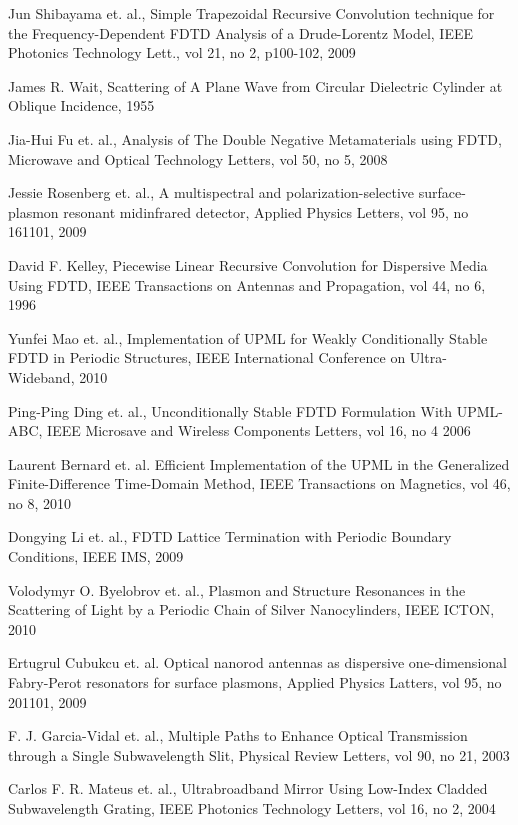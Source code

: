 \begin{thebibliography}{999}
  \bibitem
  {}  
  Jun Shibayama et. al., Simple Trapezoidal Recursive Convolution technique for the Frequency-Dependent FDTD Analysis of a Drude-Lorentz Model, IEEE Photonics Technology Lett., vol 21, no 2, p100-102, 2009

  \bibitem
  {}
  James R. Wait, Scattering of A Plane Wave from Circular Dielectric Cylinder at Oblique Incidence, 1955

  \bibitem
  {}
  Jia-Hui Fu et. al., Analysis of The Double Negative Metamaterials using FDTD, Microwave and Optical Technology Letters, vol 50, no 5, 2008

  \bibitem
  {}
  Jessie Rosenberg et. al., A multispectral and polarization-selective surface-plasmon resonant midinfrared detector, Applied Physics Letters, vol 95, no 161101, 2009

  \bibitem
  {}
  David F. Kelley, Piecewise Linear Recursive Convolution for Dispersive Media Using FDTD, IEEE Transactions on Antennas and Propagation, vol 44, no 6, 1996

  \bibitem
  {}
  Yunfei Mao et. al., Implementation of UPML for Weakly Conditionally Stable FDTD in Periodic Structures, IEEE International Conference on Ultra-Wideband, 2010

  \bibitem
  {}
  Ping-Ping Ding et. al., Unconditionally Stable FDTD Formulation With UPML-ABC, IEEE Microsave and Wireless Components Letters, vol 16, no 4 2006

  \bibitem
  {}
  Laurent Bernard et. al. Efficient Implementation of the UPML in the Generalized Finite-Difference Time-Domain Method, IEEE Transactions on Magnetics, vol 46, no 8, 2010

  \bibitem
  {}
  Dongying Li et. al., FDTD Lattice Termination with Periodic Boundary Conditions, IEEE IMS, 2009

  \bibitem
  {}
  Volodymyr O. Byelobrov et. al., Plasmon and Structure Resonances in the Scattering of Light by a Periodic Chain of Silver Nanocylinders, IEEE ICTON, 2010

  \bibitem
  {}
  Ertugrul Cubukcu et. al. Optical nanorod antennas as dispersive one-dimensional Fabry-Perot resonators for surface plasmons, Applied Physics Latters, vol 95, no 201101, 2009

  \bibitem
  {}
  F. J. Garcia-Vidal et. al., Multiple Paths to Enhance Optical Transmission through a Single Subwavelength Slit, Physical Review Letters, vol 90, no 21, 2003

  \bibitem
  {}
  Carlos F. R. Mateus et. al., Ultrabroadband Mirror Using Low-Index Cladded Subwavelength Grating, IEEE Photonics Technology Letters, vol 16, no 2, 2004

\end{thebibliography}
